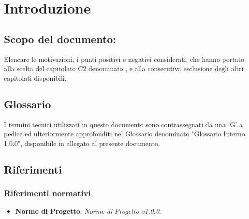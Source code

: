 \section{Introduzione}

\subsection{Scopo del documento:}
Elencare le motivazioni, i punti positivi e negativi considerati, che hanno portato alla scelta del capitolato C2 denominato \NomeProgetto, e alla consecutiva esclusione degli altri capitolati disponibili.

\subsection{Glossario}
I termini tecnici utilizzati in questo documento sono contrassegnati da una ’G’ a pedice ed ulteriormente approfonditi nel Glossario denominato "Glossario Interno 1.0.0", disponibile in allegato al presente documento.

\subsection{Riferimenti}

	\subsubsection{Riferimenti normativi}
	\begin{itemize}
		\item \textbf{Norme di Progetto}: \textit{Norme di Progetto v1.0.0}.
	\end{itemize}
		
